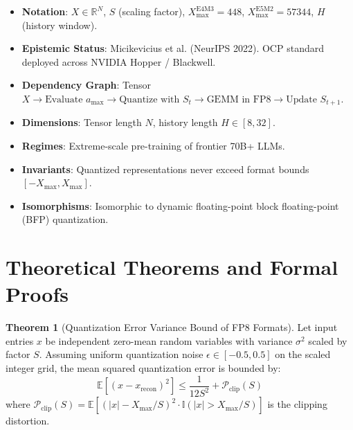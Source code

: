 \documentclass[11pt,a4paper]{article}
\theoremstyle{definition}
\newtheorem{theorem}{\textbf{Theorem}}[section]
\begin{document}
\begin{itemize}
    \item \textbf{Notation}: $X \in \mathbb{R}^N$, $S$ (scaling factor), $X_{\max}^{\text{E4M3}} = 448$, $X_{\max}^{\text{E5M2}} = 57344$, $H$ (history window).
    \item \textbf{Epistemic Status}: Micikevicius et al. (NeurIPS 2022). OCP standard deployed across NVIDIA Hopper / Blackwell.
    \item \textbf{Dependency Graph}: Tensor $X \to \text{Evaluate } a_{\max} \to \text{Quantize with } S_t \to \text{GEMM in FP8} \to \text{Update } S_{t+1}$.
    \item \textbf{Dimensions}: Tensor length $N$, history length $H \in [8, 32]$.
    \item \textbf{Regimes}: Extreme-scale pre-training of frontier 70B+ LLMs.
    \item \textbf{Invariants}: Quantized representations never exceed format bounds $[-X_{\max}, X_{\max}]$.
    \item \textbf{Isomorphisms}: Isomorphic to dynamic floating-point block floating-point (BFP) quantization.
\end{itemize}

\section{Theoretical Theorems and Formal Proofs}

\begin{theorem}[Quantization Error Variance Bound of FP8 Formats]
Let input entries $x$ be independent zero-mean random variables with variance $\sigma^2$ scaled by factor $S$. Assuming uniform quantization noise $\epsilon \in [-0.5, 0.5]$ on the scaled integer grid, the mean squared quantization error is bounded by:
{\boldmath
\begin{equation}
\mathbb{E}\left[ (x - x_{\text{recon}})^2 \right] \le \frac{1}{12 S^2} + \mathcal{P}_{\text{clip}}(S)
\end{equation}
}
where $\mathcal{P}_{\text{clip}}(S) = \mathbb{E}\left[ (|x| - X_{\max}/S)^2 \cdot \mathbb{I}(|x| > X_{\max}/S) \right]$ is the clipping distortion.
\end{theorem}
\end{document}
